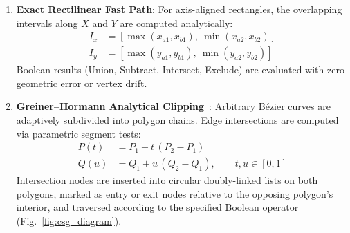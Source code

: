\documentclass[10pt,journal,compsoc]{IEEEtran}
\begin{document}
\begin{enumerate}
    \item \textbf{Exact Rectilinear Fast Path}: For axis-aligned rectangles, the overlapping intervals along $X$ and $Y$ are computed analytically:
    \begin{align}
    I_x &= [\max(x_{a1}, x_{b1}),\ \min(x_{a2}, x_{b2})] \\
    I_y &= [\max(y_{a1}, y_{b1}),\ \min(y_{a2}, y_{b2})]
    \end{align}
    Boolean results (Union, Subtract, Intersect, Exclude) are evaluated with zero geometric error or vertex drift.
    \item \textbf{Greiner--Hormann Analytical Clipping}~\cite{greiner1998}: Arbitrary Bézier curves are adaptively subdivided into polygon chains. Edge intersections are computed via parametric segment tests:
    \begin{align}
    P(t) &= P_1 + t\,(P_2 - P_1) \\
    Q(u) &= Q_1 + u\,(Q_2 - Q_1), \qquad t, u \in [0, 1]
    \end{align}
    Intersection nodes are inserted into circular doubly-linked lists on both polygons, marked as entry or exit nodes relative to the opposing polygon's interior, and traversed according to the specified Boolean operator (Fig.~\ref{fig:csg_diagram}).
\end{enumerate}
\end{document}
